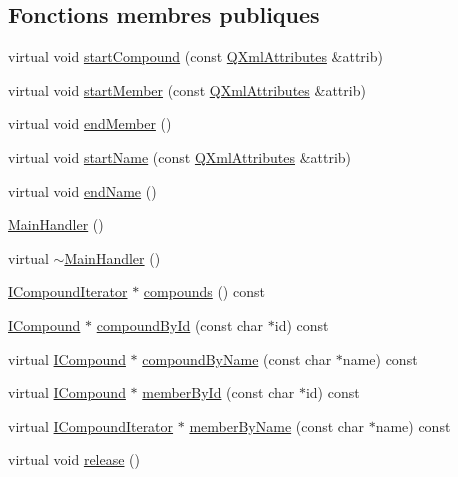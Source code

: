 \subsection*{Fonctions membres publiques}
\begin{DoxyCompactItemize}
\item 
virtual void \hyperlink{class_main_handler_a812f82b37136d4c2aa5a96cbd29f8c50}{start\+Compound} (const \hyperlink{class_q_xml_attributes}{Q\+Xml\+Attributes} \&attrib)
\item 
virtual void \hyperlink{class_main_handler_a5f3b574860236e5e5d157f6790ff794e}{start\+Member} (const \hyperlink{class_q_xml_attributes}{Q\+Xml\+Attributes} \&attrib)
\item 
virtual void \hyperlink{class_main_handler_ad2cc00ab16466ec886ef5f54defd2194}{end\+Member} ()
\item 
virtual void \hyperlink{class_main_handler_ab21db32d56079b731441c961cf182613}{start\+Name} (const \hyperlink{class_q_xml_attributes}{Q\+Xml\+Attributes} \&attrib)
\item 
virtual void \hyperlink{class_main_handler_a6ba079fd62d9a24ec7b3ddf3be2f2d9b}{end\+Name} ()
\item 
\hyperlink{class_main_handler_a3f31bdc48d25c685ed6f9737f87a7549}{Main\+Handler} ()
\item 
virtual \hyperlink{class_main_handler_a7469252d22f259429c17800367588397}{$\sim$\+Main\+Handler} ()
\item 
\hyperlink{class_i_compound_iterator}{I\+Compound\+Iterator} $\ast$ \hyperlink{class_main_handler_a38f1d4046c78ae3253bd613f2bc3edc4}{compounds} () const 
\item 
\hyperlink{class_i_compound}{I\+Compound} $\ast$ \hyperlink{class_main_handler_acbde80540526c236ae20d56521b29539}{compound\+By\+Id} (const char $\ast$id) const 
\item 
virtual \hyperlink{class_i_compound}{I\+Compound} $\ast$ \hyperlink{class_main_handler_a290767a8ef3301ec6a9353fa16539c1c}{compound\+By\+Name} (const char $\ast$name) const 
\item 
virtual \hyperlink{class_i_compound}{I\+Compound} $\ast$ \hyperlink{class_main_handler_a7924b35d39533fd0136ecc585eeac120}{member\+By\+Id} (const char $\ast$id) const 
\item 
virtual \hyperlink{class_i_compound_iterator}{I\+Compound\+Iterator} $\ast$ \hyperlink{class_main_handler_a2f22677c80c656599044358c1dee1c29}{member\+By\+Name} (const char $\ast$name) const 
\item 
virtual void \hyperlink{class_main_handler_a1f9507df93308fe3002cc2d97bd8c8be}{release} ()

\end{DoxyCompactItemize}
